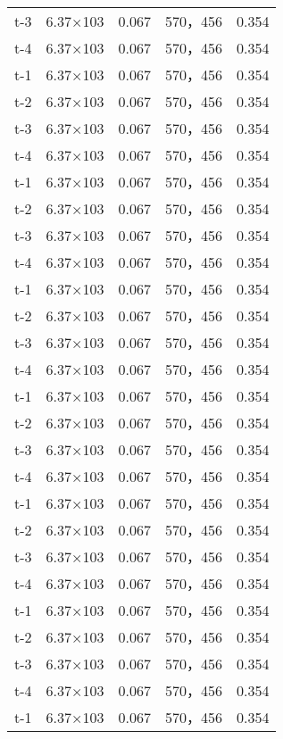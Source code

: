 \begin{longtable}{ccccc}
t-3     &6.37×103       &0.067  &570，456        &0.354\\
t-4     &6.37×103       &0.067  &570，456        &0.354\\
t-1     &6.37×103       &0.067  &570，456        &0.354\\
t-2     &6.37×103       &0.067  &570，456        &0.354\\
t-3     &6.37×103       &0.067  &570，456        &0.354\\
t-4     &6.37×103       &0.067  &570，456        &0.354\\
t-1     &6.37×103       &0.067  &570，456        &0.354\\
t-2     &6.37×103       &0.067  &570，456        &0.354\\
t-3     &6.37×103       &0.067  &570，456        &0.354\\
t-4     &6.37×103       &0.067  &570，456        &0.354\\
t-1     &6.37×103       &0.067  &570，456        &0.354\\
t-2     &6.37×103       &0.067  &570，456        &0.354\\
t-3     &6.37×103       &0.067  &570，456        &0.354\\
t-4     &6.37×103       &0.067  &570，456        &0.354\\
t-1     &6.37×103       &0.067  &570，456        &0.354\\
t-2     &6.37×103       &0.067  &570，456        &0.354\\
t-3     &6.37×103       &0.067  &570，456        &0.354\\
t-4     &6.37×103       &0.067  &570，456        &0.354\\
t-1     &6.37×103       &0.067  &570，456        &0.354\\
t-2     &6.37×103       &0.067  &570，456        &0.354\\
t-3     &6.37×103       &0.067  &570，456        &0.354\\
t-4     &6.37×103       &0.067  &570，456        &0.354\\
t-1     &6.37×103       &0.067  &570，456        &0.354\\
t-2     &6.37×103       &0.067  &570，456        &0.354\\
t-3     &6.37×103       &0.067  &570，456        &0.354\\
t-4     &6.37×103       &0.067  &570，456        &0.354\\
t-1     &6.37×103       &0.067  &570，456        &0.354\\

\end{longtable}
